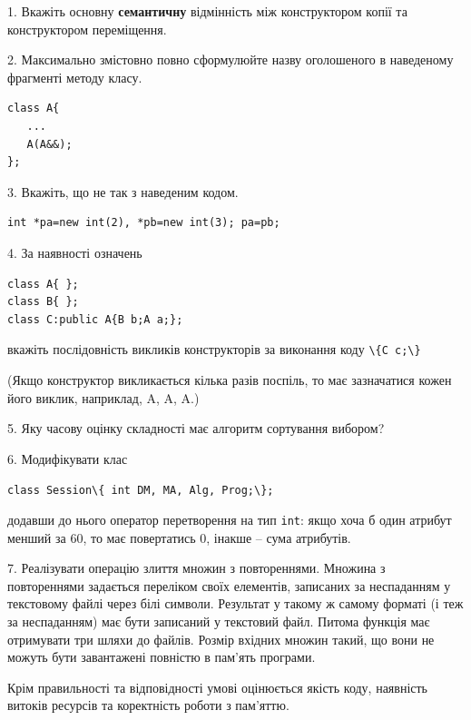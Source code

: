 \documentclass[12pt, ukrainian]{article}
\def\code#1{\Verb!#1!}
\begin{document}
{%
1. Вкажіть основну \textbf{семантичну} відмінність між конструктором копії та конструктором переміщення.%
\par
\vspace{2mm}
2. Максимально змістовно повно сформулюйте назву оголошеного в наведеному фрагменті методу класу.
\vspace{-3mm}
\begin{verbatim}class A{
   ...
   A(A&&);
};\end{verbatim}
\vspace{-3mm}
\par
\vspace{2mm}
3. Вкажіть, що не так з наведеним кодом.
\vspace{-3mm}
\begin{verbatim}int *pa=new int(2), *pb=new int(3); pa=pb;\end{verbatim}
\vspace{-3mm}
\par
\vspace{2mm}
4. За наявності означень
\vspace{-3mm}
\begin{verbatim}
class A{ };
class B{ };
class C:public A{B b;A a;};\end{verbatim}
\vspace{-3mm}
вкажіть послідовність викликів конструкторів за виконання коду \code{\{C c;\}} 

(Якщо конструктор викликається кілька разів поспіль, то має зазначатися кожен його виклик, наприклад, A, A, A.)

\vspace{2mm}
5. Яку часову оцінку складності має алгоритм сортування вибором?
\par
\vspace{2mm}
6. Модифікувати клас 

\qquad\code{class Session\{ int DM, MA, Alg, Prog;\};} 


додавши до нього оператор перетворення на тип \code{int}: якщо хоча б один атрибут менший за 60, то має повертатись 0, інакше -- сума атрибутів.%
\par
\vspace{2mm}
7. 
Реалізувати операцію злиття множин з повтореннями. Множина з повтореннями задається переліком своїх елементів, записаних за неспаданням у текстовому файлі через білі символи. Результат у такому ж самому форматі (і теж за неспаданням) має бути записаний у текстовий файл. Питома функція має отримувати три шляхи до файлів. Розмір вхідних множин такий, що вони не можуть бути завантажені повністю в пам’ять програми.

Крім правильності та відповідності умові оцінюється якість коду, наявність витоків ресурсів та коректність роботи з пам'яттю. 

}
\end{document}

